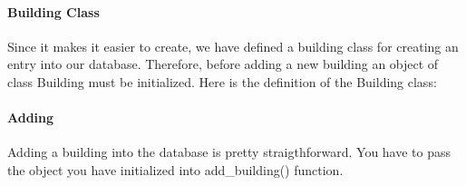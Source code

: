 \documentclass[letterpaper,10pt,english]{sphinxmanual}
\begin{document}
\paragraph{Building Class}
\label{\detokenize{developer/kaplan:building-class}}
Since it makes it easier to create, we have defined a building class for creating an entry into our database.
Therefore, before adding a new building an object of class Building must be initialized. Here is the definition of
the Building class:

\begin{sphinxVerbatim}[commandchars=\\\{\}]
 
        
          
          
          
\end{sphinxVerbatim}


\paragraph{Adding}
\label{\detokenize{developer/kaplan:id2}}
Adding a building into the database is pretty straigthforward. You have to pass the object you have initialized
into add\_building() function.
\end{document}
